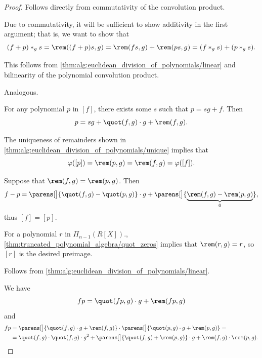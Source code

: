 \begin{proof}
   Follows directly from commutativity of the convolution product.

   Due to commutativity, it will be sufficient to show additivity in the first argument; that is, we want to show that
  \begin{equation*}
    (f + p) \ast_g s = \rem((f + p)s, g) = \rem(fs, g) + \rem(ps, g) = (f \ast_g s) + (p \ast_g s).
  \end{equation*}

  This follows from \cref{thm:alg:euclidean_division_of_polynomials/linear} and bilinearity of the polynomial convolution product.

   Analogous.


   For any polynomial \( p \) in \( [f] \), there exists some \( s \) such that \( p = sg + f \). Then
  \begin{equation*}
    p = sg + \quot(f, g) \cdot g + \rem(f, g).
  \end{equation*}

  The uniqueness of remainders shown in \cref{thm:alg:euclidean_division_of_polynomials/unique} implies that
  \begin{equation*}
    \varphi([p]) = \rem(p, g) = \rem(f, g) = \varphi([f]).
  \end{equation*}

   Suppose that \( \rem(f, g)  = \rem(p, g) \). Then
  \begin{equation*}
    f - p = \parens[\big]{ \quot(f, g) - \quot(p, g) } \cdot g + \parens[\big]{ \underbrace{\rem(f, g) - \rem(p, g)}_{0} },
  \end{equation*}
  thus \( [f] = [p] \).

   For a polynomial \( r \) in \( \Pi_{n-1}(R[X]) \).,\cref{thm:truncated_polynomial_algebra/quot_zeros} implies that \( \rem(r, g) = r \), so \( [r] \) is the desired preimage.

   Follows from \cref{thm:alg:euclidean_division_of_polynomials/linear}.

   We have
  \begin{equation*}
    fp = \quot(fp, g) \cdot g + \rem(fp, g)
  \end{equation*}
  and
  \begin{align*}
    fp
    &=
    \parens[\big]{ \quot(f, g) \cdot g + \rem(f, g) } \cdot \parens[\big]{ \quot(p, g) \cdot g + \rem(p, g) }
    = \\ &=
    \quot(f, g) \cdot \quot(f, g) \cdot g^2 + \parens[\big]{ \quot(f, g) + \rem(p, g) } \cdot g + \rem(f, g) \cdot \rem(p, g).
  \end{align*}


\end{proof}
